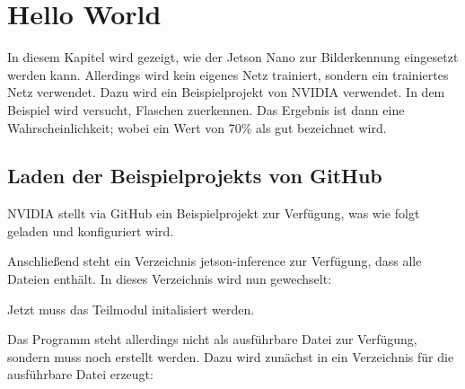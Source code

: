 %
%

\chapter{\glqq Hello World\grqq }


In diesem Kapitel wird gezeigt, wie der Jetson Nano zur Bilderkennung eingesetzt werden kann. Allerdings wird kein eigenes Netz trainiert, sondern ein trainiertes Netz verwendet. Dazu wird ein Beispielprojekt von NVIDIA verwendet. In dem Beispiel wird versucht, Flaschen zuerkennen. Das Ergebnis ist dann eine Wahrscheinlichkeit; wobei ein Wert von 70\% als gut bezeichnet wird. 



\section{Laden der Beispielprojekts von GitHub}

NVIDIA stellt via GitHub ein Beispielprojekt zur Verfügung, was wie folgt geladen und konfiguriert wird.

\medskip



\medskip


Anschließend steht ein Verzeichnis jetson-inference zur Verfügung, dass alle Dateien enthält. In dieses Verzeichnis wird nun gewechselt:

\medskip


\medskip

Jetzt muss das Teilmodul initalisiert werden.

\medskip


\medskip

Das Programm steht allerdings nicht als ausführbare Datei zur Verfügung, sondern muss noch erstellt werden. Dazu wird zunächst in ein Verzeichnis für die ausführbare Datei erzeugt:

\medskip


